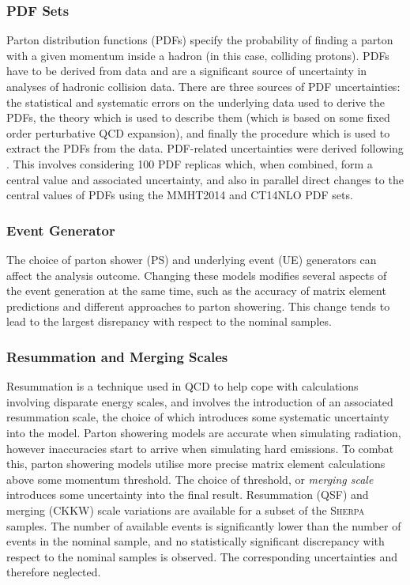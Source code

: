 \subsubsection{PDF Sets}

Parton distribution functions (PDFs) specify the probability of finding a parton with a given momentum inside a hadron (in this case, colliding protons).
PDFs have to be derived from data and are a significant source of uncertainty in analyses of hadronic collision data.
There are three sources of PDF uncertainties: the statistical and systematic errors on the underlying data used to derive the PDFs, the theory which is used to describe them (which is based on some fixed order perturbative QCD expansion), and finally the procedure which is used to extract the PDFs from the data. 
PDF-related uncertainties were derived following .
This involves considering 100 PDF replicas which, when combined, form a central value and associated uncertainty, and also in parallel direct changes to the central values of PDFs using the MMHT2014 \cite{Harland-Lang:2014zoa} and CT14NLO \cite{Dulat:2015mca} PDF sets.

\subsubsection{Event Generator}

The choice of parton shower (PS) and underlying event (UE) generators can affect the analysis outcome.
Changing these models modifies several aspects of the event generation at the same time, such as the accuracy of matrix element predictions and different approaches to parton showering.
This change tends to lead to the largest disrepancy with respect to the nominal samples.

\subsubsection{Resummation and Merging Scales}

Resummation is a technique used in QCD to help cope with calculations involving disparate energy scales, and involves the introduction of an associated resummation scale, the choice of which introduces some systematic uncertainty into the model.
Parton showering models are accurate when simulating \lowpt radiation, however inaccuracies start to arrive when simulating hard emissions.
To combat this, parton showering models utilise more precise matrix element calculations above some momentum threshold.
The choice of threshold, or \textit{merging scale} introduces some uncertainty into the final result.
Resummation (QSF) and merging (CKKW) scale variations are available for a subset of the \textsc{Sherpa} samples.
The number of available events is significantly lower than the number of events in the nominal sample, and no statistically significant discrepancy with respect to the nominal samples is observed.
The corresponding uncertainties and therefore neglected.



